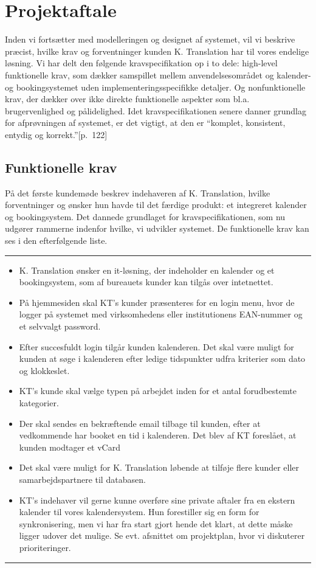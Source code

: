 \documentclass[12pt]{article}   %
\begin{document}
\section{Projektaftale}
Inden vi fortsætter med modelleringen og designet af systemet, vil vi beskrive
præcist, hvilke krav og forventninger kunden K. Translation har til vores
endelige løsning. Vi har delt den følgende kravspecifikation op i to dele:
high-level funktionelle krav, som dækker samspillet mellem anvendelsesområdet og
kalender- og bookingsystemet uden implementeringsspecifikke detaljer. Og
nonfunktionelle krav, der dækker over ikke direkte funktionelle aspekter som
bl.a. brugervenlighed og pålidelighed. Idet kravspecifikationen senere danner
grundlag for afprøvningen af systemet, er det vigtigt, at den er ``komplet,
konsistent, entydig og korrekt.''\cite{oose}[p.~122] \\

\subsection{Funktionelle krav}
På det første kundemøde beskrev indehaveren af K. Translation, hvilke
forventninger og ønsker hun havde til det færdige produkt: et integreret
kalender og bookingsystem. Det dannede grundlaget for kravspecifikationen, som
nu udgører rammerne indenfor hvilke, vi udvikler systemet. De funktionelle
krav kan ses i den efterfølgende liste.\\


\rule{120mm}{1mm}
\begin{itemize}
\item K. Translation ønsker en it-løsning, der indeholder en kalender og et
	bookingsystem, som af bureauets kunder kan tilgås over intetnettet.
\item På hjemmesiden skal KT's kunder præsenteres for en login menu, hvor de
	logger på systemet med virksomhedens eller institutionens EAN-nummer
	og et selvvalgt password. 
\item Efter succesfuldt login tilgår kunden kalenderen. Det skal være muligt
	for kunden at søge i kalenderen efter ledige tidspunkter udfra kriterier 
	som dato og klokkeslet. 
\item KT's kunde skal vælge typen på arbejdet inden for et antal forudbestemte
	kategorier.
\item Der skal sendes en bekræftende email tilbage til kunden, efter at
	vedkommende har booket en tid i kalenderen. Det blev af KT foreslået,
	at kunden modtager et vCard   
\item Det skal være muligt for K. Translation løbende at tilføje flere kunder 
	eller samarbejdspartnere til databasen. 
\item KT's indehaver vil gerne kunne overføre sine private aftaler fra en
	ekstern kalender til vores kalendersystem. Hun forestiller sig en form
	for synkronisering, men vi har fra start gjort hende det klart, at
	dette måske ligger udover det mulige. Se evt. afsnittet om
	projektplan, hvor vi diskuterer prioriteringer. 
\end{itemize}
\rule{120mm}{1mm}
\vspace{0.5cm}
\end{document}
